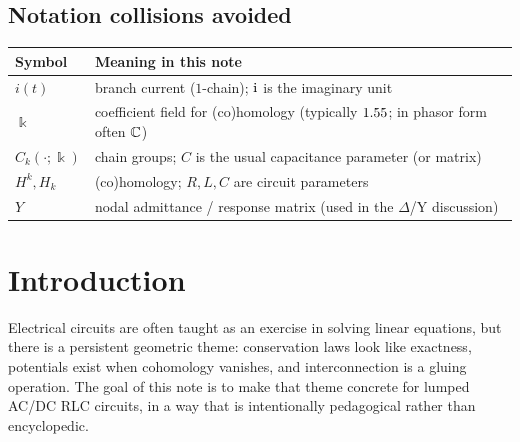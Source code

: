 \documentclass[11pt]{article}
\begin{document}
\subsection*{Notation collisions avoided}
\begin{center}
\begin{tabular}{p{}p{}}
\hline
Symbol & Meaning in this note \\
\hline
$i(t)$ & branch current ($1$-chain); \quad $\mathrm{i}$ is the imaginary unit \\
$\Bbbk$ & coefficient field for (co)homology (typically $1.55$; in phasor form often $\mathbb{C}$) \\
$C_k(\cdot;\Bbbk)$ & chain groups; \quad $C$ is the usual capacitance parameter (or matrix) \\
$H^k,H_k$ & (co)homology; \quad $R,L,C$ are circuit parameters \\
$Y$ & nodal admittance / response matrix (used in the $\Delta$/Y discussion) \\
\hline
\end{tabular}
\end{center}

\section{Introduction}
\label{sec:intro}
Electrical circuits are often taught as an exercise in solving linear equations, but there is a persistent geometric theme: conservation laws look like exactness, potentials exist when cohomology vanishes, and interconnection is a gluing operation.
The goal of this note is to make that theme concrete for lumped AC/DC RLC circuits, in a way that is intentionally pedagogical rather than encyclopedic.
\end{document}

